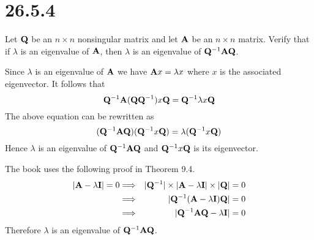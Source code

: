 \section*{26.5.4}
Let $\bf Q$ be an $n\times n$ nonsingular matrix and let $\bf A$
be an $n\times n$ matrix.
Verify that if $\lambda$ is an eigenvalue of $\bf A$,
then $\lambda$ is an eigenvalue of ${\bf Q}^{-1}\bf AQ$.

\bigskip
\noindent
Since $\lambda$ is an eigenvalue of $\bf A$ we have
${\bf A}x=\lambda x$ where $x$ is the associated eigenvector.
It follows that
$${\bf Q}^{-1}{\bf A}({\bf QQ}^{-1})x{\bf Q}
={\bf Q}^{-1}\lambda x\bf Q$$
The above equation can be rewritten as
$$({\bf Q}^{-1}{\bf A}{\bf Q})({\bf Q}^{-1}x{\bf Q})
=\lambda({\bf Q}^{-1}x\bf Q)$$
Hence $\lambda$ is an eigenvalue of ${\bf Q}^{-1}\bf AQ$
and ${\bf Q}^{-1}x\bf Q$ is its eigenvector.

\bigskip
\noindent
The book uses the following proof in Theorem 9.4.
\begin{eqnarray*}
|{\bf A}-\lambda{\bf I}|=0
&\Longrightarrow&|{\bf Q}^{-1}|
\times|{\bf A}-\lambda{\bf I}|
\times|{\bf Q}|=0\\
&\Longrightarrow&
|{\bf Q}^{-1}({\bf A}-\lambda{\bf I}){\bf Q}|=0\\
&\Longrightarrow&
|{\bf Q}^{-1}{\bf AQ}-\lambda{\bf I}|=0
\end{eqnarray*}
Therefore $\lambda$ is an eigenvalue of ${\bf Q}^{-1}{\bf AQ}$.
